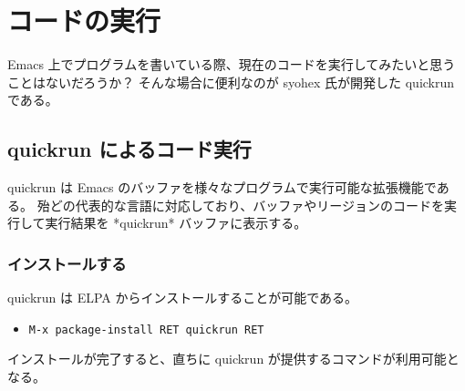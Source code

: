\section{コードの実行}
Emacs 上でプログラムを書いている際、現在のコードを実行してみたいと思うことはないだろうか？
そんな場合に便利なのが syohex 氏が開発した quickrun である。
\subsection{quickrun によるコード実行}
quickrun は Emacs のバッファを様々なプログラムで実行可能な拡張機能である。
殆どの代表的な言語に対応しており、バッファやリージョンのコードを実行して実行結果を *quickrun* バッファに表示する。
\subsubsection{インストールする}
quickrun は ELPA からインストールすることが可能である。
\begin{itemize}\setlength{\leftskip}{-1.00zw}%
\item[] \texttt{M-x package-install RET quickrun RET}
\end{itemize}
インストールが完了すると、直ちに quickrun が提供するコマンドが利用可能となる。
